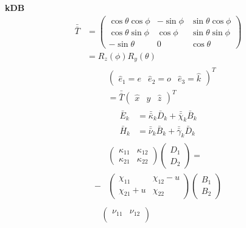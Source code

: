\documentclass[12pt]{article}
\begin{document}
\begin{multicols}{3}
\textbf{kDB}
\begin{align}
  \bar{\bar{T}} &=
  \begin{pmatrix}
    \cos\theta\cos\phi & -\sin\phi & \sin\theta\cos\phi\\
    \cos\theta\sin\phi & \cos\phi & \sin\theta\sin\phi\\
    -\sin\theta & 0 & \cos\theta
  \end{pmatrix}\\
  &= R_z(\phi) R_y(\theta)
\end{align}
\begin{align}
  \begin{split}
    &\begin{pmatrix} \hat{e}_1 = e & \hat{e}_2 = o & \hat{e}_3=\hat{k}\end{pmatrix}^T\\
    &= \bar{\bar{T}}
    \begin{pmatrix} \hat{x} & \hat{y} & \hat{z}\end{pmatrix}^T
  \end{split}
\end{align}
\begin{align}
  \bar{E}_k &= \bar{\bar{\kappa}}_k \bar{D}_k + \bar{\bar{\chi}}_k \bar{B}_k\\
  \bar{H}_k &= \bar{\bar{\nu}}_k \bar{B}_k + \bar{\bar{\gamma}}_k \bar{D}_k
\end{align}
\begin{align}
  \begin{split}
  &\begin{pmatrix}
    \kappa_{11} & \kappa_{12}\\
    \kappa_{21} & \kappa_{22}
  \end{pmatrix}
  {}\begin{pmatrix}
    D_1\\
    D_2
  \end{pmatrix} =\\
  -&\begin{pmatrix}
    \chi_{11} & \chi_{12} - u\\
    \chi_{21} + u & \chi_{22}
  \end{pmatrix}
  \begin{pmatrix}
    B_1\\
    B_2
  \end{pmatrix}
  \end{split}\\
  \begin{split}
  &\begin{pmatrix}
    \nu_{11} & \nu_{12}\\

\end{pmatrix}
\end{split}
\end{align}
\end{multicols}
\end{document}
